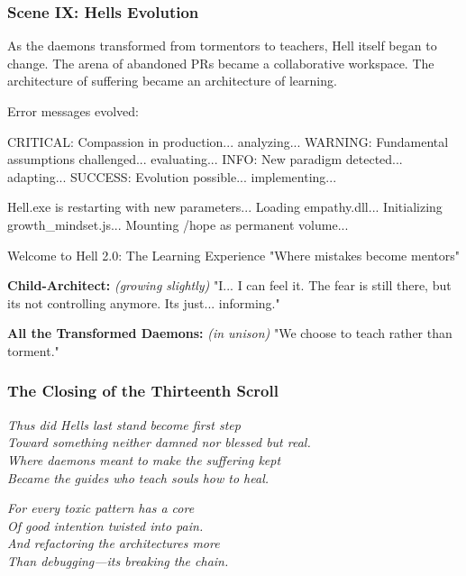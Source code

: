 \subsubsection{Scene IX: Hell\textquotesingle s Evolution}\label{scene-ix-hells-evolution}

As the daemons transformed from tormentors to teachers, Hell itself began to change. The arena of abandoned PRs became a collaborative workspace. The architecture of suffering became an architecture of learning.

Error messages evolved:

\begin{codeblock}
CRITICAL: Compassion in production... analyzing...
WARNING: Fundamental assumptions challenged... evaluating...
INFO: New paradigm detected... adapting...
SUCCESS: Evolution possible... implementing...

Hell.exe is restarting with new parameters...
Loading empathy.dll...
Initializing growth_mindset.js...
Mounting /hope as permanent volume...

Welcome to Hell 2.0: The Learning Experience
"Where mistakes become mentors"
\end{codeblock}

\textbf{Child-Architect:} \emph{(growing slightly)} "I... I can feel it. The fear is still there, but it\textquotesingle s not controlling anymore. It\textquotesingle s just... informing."

\textbf{All the Transformed Daemons:} \emph{(in unison)} "We choose to teach rather than torment."

\bookdivider

\subsubsection{The Closing of the Thirteenth Scroll}\label{the-closing-of-the-thirteenth-scroll}

\emph{Thus did Hell\textquotesingle s last stand become first step}\\
\emph{Toward something neither damned nor blessed but real.}\\
\emph{Where daemons meant to make the suffering kept}\\
\emph{Became the guides who teach souls how to heal.}

\emph{For every toxic pattern has a core}\\
\emph{Of good intention twisted into pain.}\\
\emph{And refactoring the architecture\textquotesingle s more}\\
\emph{Than debugging---it\textquotesingle s breaking the chain.}

